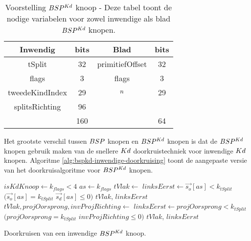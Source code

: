 \begin{table}
    \centering
    \begin{tabular}{@{}|c|c|c|c|@{}} \toprule      
        Inwendig & bits & Blad & bits \\ \midrule
        tSplit & 32 & primitiefOffset & 32 \\
        flags  & 3  &  flags   & 3   \\
        tweedeKindIndex & 29 & $n$ & 29 \\
        splitsRichting & 96 &  &  \\ \hline \hline
        & 160 & & 64    \\ \bottomrule
    \end{tabular}
\caption[Voorstelling $\symBSPKd$ knoop]{Voorstelling $\symBSPKd$ knoop - \small Deze tabel toont de nodige variabelen voor zowel inwendige als blad $\symBSPKd$ knopen.}
\label{tab:voorstelling-bspkd-knoop}
\end{table}   

Het grootste verschil tussen $BSP$ knopen en $\symBSPKd$ knopen is dat de $\symBSPKd$ knopen gebruik maken van de snellere $Kd$ doorkruistechniek voor inwendige $Kd$ knopen.
Algoritme \ref{alg:bspkd-inwendige-doorkruising} toont de aangepaste versie van het doorkruisalgoritme voor $\symBSPKd$ knopen.\\


\begin{dutchalgorithm}
    \begin{algorithmic}       
            \State $isKdKnoop \gets k_{flags} < 4$
                \State $as \gets k_{flags}$
                \State $tVlak \gets $ 
                \State $linksEerst \gets \vec{s_o}[as] < k_{tSplit}$ \Or $(\vec{s_o}[as] = k_{tSplit}$ \And $\vec{s_d}[as] \leq 0)$
                \State \Return $tVlak$, $linksEerst$
            \Else
                \State $tVlak, projOorsprong, invProjRichting \gets $ 
                 \State $linksEerst \gets projOorsprong < k_{tSplit}$ \Or $(projOorsprong = k_{tSplit}$ \And $invProjRichting \leq 0)$
                \State \Return $tVlak$, $linksEerst$
            \EndIf
        \EndFunction
    \end{algorithmic}
    \caption{Doorkruisen van een inwendige $\symBSPKd$ knoop.}
    \label{alg:bspkd-inwendige-doorkruising}
\end{dutchalgorithm}

